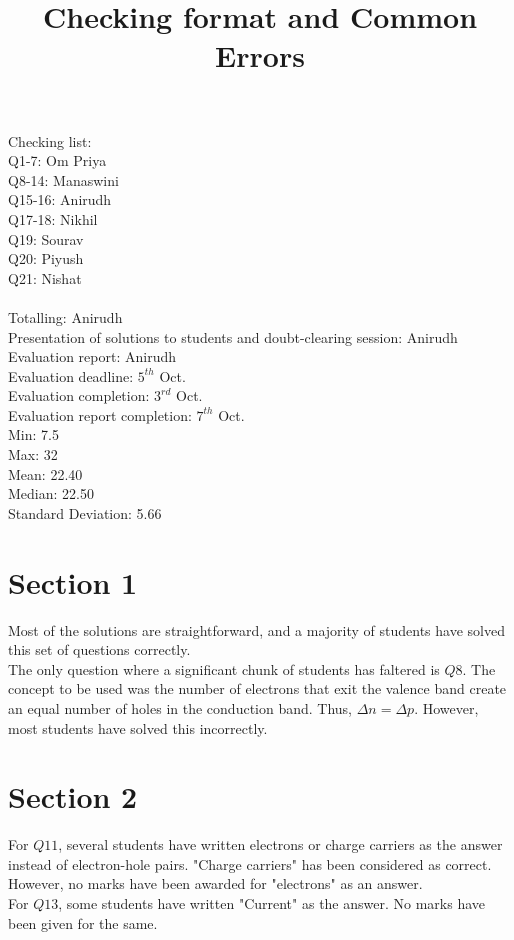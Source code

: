 \documentclass[12pt]{article}\date{}
\begin{document}
\title{Checking format and Common Errors}
\maketitle

\noindent Checking list: \\
Q1-7: Om Priya \\
Q8-14: Manaswini \\
Q15-16: Anirudh \\
Q17-18: Nikhil \\
Q19: Sourav \\
Q20: Piyush \\
Q21: Nishat \\ \\
Totalling: Anirudh \\
Presentation of solutions to students and doubt-clearing session: Anirudh \\
Evaluation report: Anirudh \\

\noindent Evaluation deadline: $5^{th}$ Oct. \\ 
Evaluation completion: $3^{rd}$ Oct. \\
Evaluation report completion: $7^{th}$ Oct. \\

\noindent Min: 7.5 \\
Max: 32 \\
Mean:  22.40\\
Median: 22.50 \\
Standard Deviation: 5.66 \\

\section{Section 1}
Most of the solutions are straightforward, and a majority of students have solved this set of questions correctly. \\ The only question where a significant chunk of students has faltered is $Q8$. The concept to be used was the number of electrons that exit the valence band create an equal number of holes in the conduction band. Thus, $\Delta n= \Delta p$. However, most students have solved this incorrectly.
\section{Section 2}
For $Q11$, several students have written electrons or charge carriers as the answer instead of electron-hole pairs. "Charge carriers" has been considered as correct. However, no marks have been awarded for "electrons" as an answer. \\
For $Q13$, some students have written "Current" as the answer. No marks have been given for the same.
\end{document}
